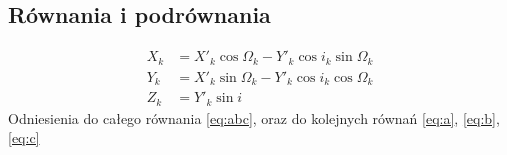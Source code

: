 \subsection{Równania i podrównania}
\begin{subequations}\label{eq:abc}
    \begin{align}
        X_k   &= X'_k \cos \Omega_k -  Y'_k \cos i_k \sin \Omega_k   \label{eq:a} \\
        Y_k   &= X'_k \sin \Omega_k -  Y'_k  \cos i_k \cos \Omega_k  \label{eq:b} \\
        Z_k   &= Y'_k  \sin i                                        \label{eq:c}
    \end{align}
\end{subequations}
Odniesienia do całego równania \eqref{eq:abc}, oraz do kolejnych równań \eqref{eq:a}, \eqref{eq:b}, \eqref{eq:c}


